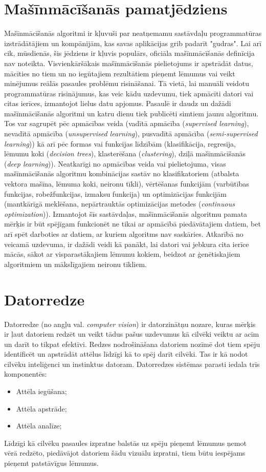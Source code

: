 \section{Mašīnmācīšanās pamatjēdziens}
Mašīnmācīšanās algoritmi ir kļuvuši par neatņemamu sastāvdaļu programmatūras izstrādātājiem un kompānijām, kas savas aplikācijas grib padarīt "gudras". Lai arī cik, mūsdienās, šis jēdziens ir kļuvis populārs, oficiāla mašīnmācīšanās definīcija nav noteikta. Visvienkāršākais mašīnmācīšanās pielietojums ir apstrādāt datus, mācīties no tiem un no iegūtajiem rezultātiem pieņemt lēmumus vai veikt minējumus reālās pasaules problēmu risināšanai. Tā vietā, lai manuāli veidotu programmatūras risinājumus, kas veic kādu uzdevumu, tiek apmācīti datori vai citas ierīces, izmantojot lielus datu apjomus. 
Pasaulē ir daudz un dažādi mašīnmācīšanās algoritmi un katru dienu tiek publicēti simtiem jaunu algoritmu. Tos var sagrupēt pēc apmācības veida (vadītā apmācība (\textit{supervised learning}), nevadītā apmācība (\textit{unsupervised learning}), pusvadītā apmācība (\textit{semi-supervised learning})) kā arī pēc formas vai funkcijas līdzībām (klasifikācija, regresija, lēmumu koki (\textit{decision trees}), klasterēšana (\textit{clustering}), dziļā mašīnmācīšanās (\textit{deep learning})). Neatkarīgi no apmācības veida vai pielietojuma, visas mašīnmācīšanās algoritmu kombinācijas sastāv no klasifikatoriem (atbalsta vektora mašīna, lēmuma koki, neironu tīkli), vērtēšanas funkcijām (varbūtības funkcijas, robežfunkcijas, izmaksu funkcija) un optimizācijas funkcijām (mantkārīgā meklēšana, nepārtrauktās optimizācijas metodes (\textit{continuous optimization})). Izmantojot šīs sastāvdaļas, mašīnmācīšanās algoritmu pamata mērķis ir būt spējīgam funkcionēt ne tikai ar apmācībā piedāvātajiem datiem, bet arī spēt darboties ar datiem, ar kuriem algoritms nav saskāries. Atkarībā no veicamā uzdevuma, ir dažādi veidi kā panākt, lai datori vai jebkura cita ierīce mācās, sākot ar visparastākajiem lēmumu kokiem, beidzot ar ģenētiskajiem algoritmiem un mākslīgajiem neironu tīkliem. 


\section{Datorredze}
Datorredze (no angļu val. \textit{computer vision}) ir datorzinātņu nozare, kuras mērķis ir ļaut datoriem redzēt un veikt tādus pašus uzdevumus kā cilvēki veiktu ar acīm un darīt to tikpat efektīvi. Redzes nodrošināšana datoriem nozīmē dot tiem spēju identificēt un apstrādāt attēlus līdzīgi kā to spēj darīt cilvēki. Tas ir kā nodot cilvēku inteliģenci un instinktus datoram. Datorredzes sistēmas parasti iedala trīs komponentēs:
\begin{itemize}
	\item Attēla iegūšana;
	\item Attēla apstrāde;
	\item Attēla analīze;
\end{itemize}
Līdzīgi kā cilvēku pasaules izpratne balstās uz spēju pieņemt lēmumus ņemot vērā redzēto, piedāvājot datoriem šādu vizuālu izpratni, tiem būtu iespējams pieņemt patstāvīgus lēmumus.

